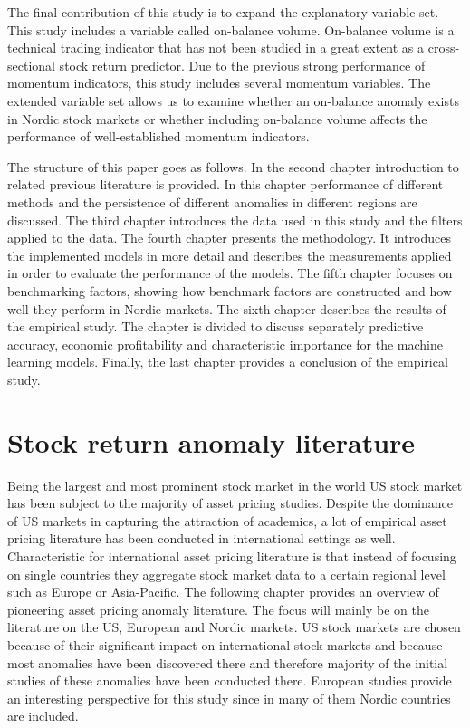 \documentclass[12pt]{article}
\begin{document}
The final contribution of this study is to expand the explanatory variable set. This study includes a variable called on-balance volume. On-balance volume is a technical trading indicator that has not been studied in a great extent as a cross-sectional stock return predictor. Due to the previous strong performance of momentum indicators, this study includes several momentum variables. The extended variable set allows us to examine whether an on-balance anomaly exists in Nordic stock markets or whether including on-balance volume affects the performance of well-established momentum indicators. \par

The structure of this paper goes as follows. In the second chapter introduction to related previous literature is provided. In this chapter performance of different methods and the persistence of different anomalies in different regions are discussed. The third chapter introduces the data used in this study and the filters applied to the data. The fourth chapter presents the methodology. It introduces the implemented models in more detail and describes the measurements applied in order to evaluate the performance of the models. The fifth chapter focuses on benchmarking factors, showing how benchmark factors are constructed and how well they perform in Nordic markets. The sixth chapter describes the results of the empirical study. The chapter is divided to discuss separately predictive accuracy, economic profitability and characteristic importance for the machine learning models. Finally, the last chapter provides a conclusion of the empirical study. \par

\section{Stock return anomaly literature}\label{StockReturnAnomalyLiterature}

Being the largest and most prominent stock market in the world US stock market has been subject to the majority of asset pricing studies. Despite the dominance of US markets in capturing the attraction of academics, a lot of empirical asset pricing literature has been conducted in international settings as well. Characteristic for international asset pricing literature is that instead of focusing on single countries they aggregate stock market data to a certain regional level such as Europe or Asia-Pacific. The following chapter provides an overview of pioneering asset pricing anomaly literature. The focus will mainly be on the literature on the US, European and Nordic markets. US stock markets are chosen because of their significant impact on international stock markets and because most anomalies have been discovered there and therefore majority of the initial studies of these anomalies have been conducted there. European studies provide an interesting perspective for this study since in many of them Nordic countries are included. \par
\end{document}
